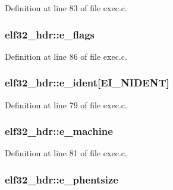 Definition at line 83 of file exec.\+c.

\hypertarget{structelf32__hdr_a8695845266a8825d6cc9c04205c783f5}{
\subsubsection[{e\+\_\+flags}]{ elf32\+\_\+hdr\+::e\+\_\+flags}}\label{structelf32__hdr_a8695845266a8825d6cc9c04205c783f5}


Definition at line 86 of file exec.\+c.

\hypertarget{structelf32__hdr_a47cad02c87b35eab4d8fda5f3f0fefd4}{
\subsubsection[{e\+\_\+ident}]{ elf32\+\_\+hdr\+::e\+\_\+ident\mbox{[}{\bf E\+I\+\_\+\+N\+I\+D\+E\+N\+T}\mbox{]}}}\label{structelf32__hdr_a47cad02c87b35eab4d8fda5f3f0fefd4}


Definition at line 79 of file exec.\+c.

\hypertarget{structelf32__hdr_ac683164e0380f6babe3f46a3a1ffdfe9}{
\subsubsection[{e\+\_\+machine}]{ elf32\+\_\+hdr\+::e\+\_\+machine}}\label{structelf32__hdr_ac683164e0380f6babe3f46a3a1ffdfe9}


Definition at line 81 of file exec.\+c.

\hypertarget{structelf32__hdr_a7c8f7ea4bb2789905be6dc875c1e502d}{
\subsubsection[{e\+\_\+phentsize}]{ elf32\+\_\+hdr\+::e\+\_\+phentsize}}\label{structelf32__hdr_a7c8f7ea4bb2789905be6dc875c1e502d}


